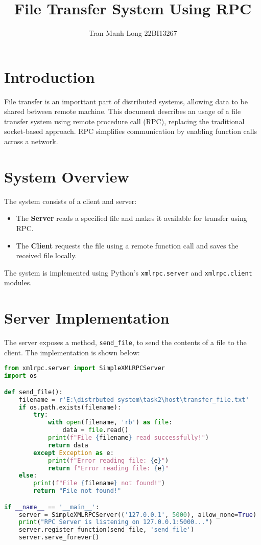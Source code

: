 \documentclass[12pt]{article}
\title{File Transfer System Using RPC}
\author{Tran Manh Long 22BI13267}
\begin{document}
\maketitle

\section{Introduction}
File transfer is an importtant part of distributed systems, allowing data to be shared between remote machine. This document describes an usage of a file transfer system using remote procedure call (RPC), replacing the traditional socket-based approach. RPC simplifies communication by enabling function calls across a network.

\section{System Overview}
The system consists of a client and server:
\begin{itemize}
    \item The \textbf{Server} reads a specified file and makes it available for transfer using RPC.
    \item The \textbf{Client} requests the file using a remote function call and saves the received file locally.
\end{itemize}
The system is implemented using Python's \texttt{xmlrpc.server} and \texttt{xmlrpc.client} modules.

\section{Server Implementation}
The server exposes a method, \texttt{send\_file}, to send the contents of a file to the client. The implementation is shown below:

\begin{lstlisting}[language=Python, caption=Server Implementation]
from xmlrpc.server import SimpleXMLRPCServer
import os

def send_file():
    filename = r'E:\distrbuted system\task2\host\transfer_file.txt'
    if os.path.exists(filename):
        try:
            with open(filename, 'rb') as file:
                data = file.read()
            print(f"File {filename} read successfully!")
            return data
        except Exception as e:
            print(f"Error reading file: {e}")
            return f"Error reading file: {e}"
    else:
        print(f"File {filename} not found!")
        return "File not found!"

if __name__ == '__main__':
    server = SimpleXMLRPCServer(('127.0.0.1', 5000), allow_none=True)
    print("RPC Server is listening on 127.0.0.1:5000...")
    server.register_function(send_file, 'send_file')
    server.serve_forever()

\end{lstlisting}
\end{document}
